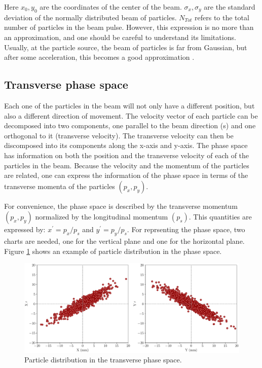 Here $x_0 , y_0$ are the coordinates of the center of the beam. $\sigma_x , \sigma_y$ are the standard deviation of the normally distributed beam of particles. $N_{Tot}$ refers to the total number of particles in the beam pulse. However, this expression is no more than an approximation, and one should be careful to understand its limitations. Usually, at the particle source, the beam of particles is far from Gaussian, but after some acceleration, this becomes a good approximation \parencite*[][]{ref:BookAccPhysics}.

\subsection{Transverse phase space}
\label{subsec:TransPhSp}

Each one of the particles in the beam will not only have a different position, but also a different direction of movement. The velocity vector of each particle can be decomposed into two components, one parallel to the beam direction (s) and one orthogonal to it (transverse velocity). The transverse velocity can then be discomposed into its components along the x-axis and y-axis. The phase space has information on both the position and the transverse velocity of each of the particles in the beam. Because the velocity and the momentum of the particles are related, one can express the information of the phase space in terms of the transverse momenta of the particles $\left(p_x , p_y \right)$. 

For convenience, the phase space is described by the transverse momentum $(p_x , p_y)$ normalized by the longitudinal momentum $(p_s)$. This quantities are expressed by: $x^{'} = p_x / p_s$ and $y^{'} = p_y / p_s$. For reprsenting the phase space, two charts are needed, one for the vertical plane and one for the horizontal plane. Figure \ref{fig:PhaseSpace} shows an example of particle distribution in the phase space. 

\begin{figure}[h]
    \centering
    \includegraphics[width=1.0\columnwidth]{Figure_PhaseSpaceDist/PhaseSpaceDist.pdf}
    \caption{Particle distribution in the transverse phase space. }
    \label{fig:PhaseSpace}
\end{figure}

